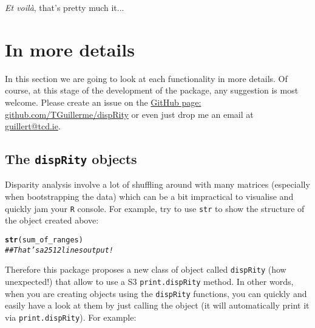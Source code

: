 \documentclass{article}\usepackage[]{graphicx}\usepackage[]{color}
\makeatletter
\newcommand{\hlcom}[1]{\textcolor[rgb]{0.678,0.584,0.686}{\textit{#1}}}%
\newcommand{\hlstd}[1]{\textcolor[rgb]{0.345,0.345,0.345}{#1}}%
\newcommand{\hlkwd}[1]{\textcolor[rgb]{0.737,0.353,0.396}{\textbf{#1}}}%
\newenvironment{kframe}{%
 \def\at@end@of@kframe{}%
 \ifinner\ifhmode%
  \def\at@end@of@kframe{\end{minipage}}%
  \begin{minipage}{\columnwidth}%
 \fi\fi%
 \def\FrameCommand##1{\hskip\@totalleftmargin \hskip-\fboxsep
 \colorbox{shadecolor}{##1}\hskip-\fboxsep
     \hskip-\linewidth \hskip-\@totalleftmargin \hskip\columnwidth}%
 \MakeFramed {\advance\hsize-\width
   \@totalleftmargin\z@ \linewidth\hsize
   \@setminipage}}%
 {\par\unskip\endMakeFramed%
 \at@end@of@kframe}
\newenvironment{knitrout}{}{} %
\newcommand{\dispRity}{\texttt{dispRity} }
\newcommand{\R}{\texttt{R} }
\makeatother
\begin{document}
\textit{Et voil\`{a}}, that's pretty much it...

\section{In more details}
In this section we are going to look at each functionality in more details. Of course, at this stage of the development of the package, any suggestion is most welcome.
Please create an issue on the \href{https://github.com/TGuillerme/dispRity}{GitHub page: github.com/TGuillerme/dispRity} or even just drop me an email at \href{mailto:guillert@tcd.ie}{guillert@tcd.ie}.

\subsection{The \dispRity objects}
Disparity analysis involve a lot of shuffling around with many matrices (especially when bootstrapping the data) which can be a bit impractical to visualise and quickly jam your \R console.
For example, try to use \texttt{str} to show the structure of the object created above:

\begin{knitrout}
\color{fgcolor}\begin{kframe}
\begin{alltt}
\hlkwd{str}\hlstd{(sum_of_ranges)}
\hlcom{## That's a 2512 lines output!}
\end{alltt}
\end{kframe}
\end{knitrout}

Therefore this package proposes a new class of object called \dispRity (how unexpected!) that allow to use a S3 \texttt{print.dispRity} method.
In other words, when you are creating objects using the \dispRity functions, you can quickly and easily have a look at them by just calling the object (it will automatically print it via \texttt{print.dispRity}).
For example:
\end{document}
